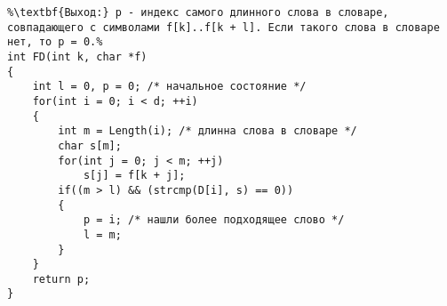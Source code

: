 \documentclass{article}
\begin{document}
\begin{lstlisting}[escapechar=\%]
%\noindent\textbf{Вход:} k - номер символа в исходном тексте, начиная с которого нужно искать в тексте слова из словаря.%
%\textbf{Выход:} p - индекс самого длинного слова в словаре, совпадающего с символами f[k]..f[k + l]. Если такого слова в словаре нет, то p = 0.%
int FD(int k, char *f)
{
	int l = 0, p = 0; /* начальное состояние */
	for(int i = 0; i < d; ++i)
	{
		int m = Length(i); /* длинна слова в словаре */
		char s[m];
		for(int j = 0; j < m; ++j)
			s[j] = f[k + j];
		if((m > l) && (strcmp(D[i], s) == 0))
		{
			p = i; /* нашли более подходящее слово */
			l = m;
		}
	}
	return p;
}
\end{lstlisting}
\end{document}
